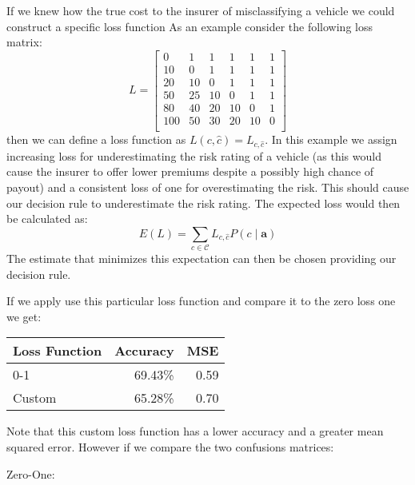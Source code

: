 If we knew how the true cost to the insurer of misclassifying a vehicle we could construct a specific loss function
As an example consider the following loss matrix:
\begin{equation}
	L = 
		\begin{bmatrix}
			0   & 1  & 1  & 1  & 1  & 1 \\
			10  & 0  & 1  & 1  & 1  & 1 \\
			20  & 10 & 0  & 1  & 1  & 1 \\
			50  & 25 & 10 & 0  & 1  & 1 \\
			80  & 40 & 20 & 10 & 0  & 1 \\
			100 & 50 & 30 & 20 & 10 & 0 \\
		\end{bmatrix}
\end{equation}
then we can define a loss function as $L(c, \hat{c}) = L_{c,\hat{c}}$.
In this example we assign increasing loss for underestimating the risk rating of a vehicle (as this would cause the insurer to offer lower premiums despite a possibly high chance of payout) and a consistent loss of one for overestimating the risk.
This should cause our decision rule to underestimate the risk rating.
The expected loss would then be calculated as:
\begin{equation}
	E(L) = \sum_{c \in \mathcal{C}} L_{c,\hat{c}}P(c \mid \mathbf{a})
\end{equation}
The estimate that minimizes this expectation can then be chosen providing our decision rule.

If we apply use this particular loss function and compare it to the zero loss one we get:
\begin{center}
	\begin{tabular}{l r r}
		\hline
		Loss Function & Accuracy & MSE  \\
		\hline
		0-1           & 69.43\%  & 0.59 \\
		Custom        & 65.28\%  & 0.70 \\
		\hline
	\end{tabular}
\end{center}

Note that this custom loss function has a lower accuracy and a greater mean squared error.
However if we compare the two confusions matrices:

Zero-One:

